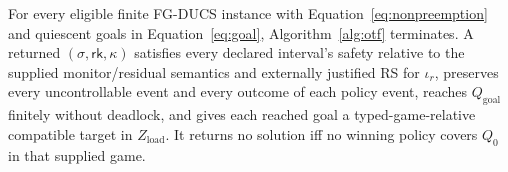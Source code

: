 \documentclass[acmsmall,screen,review,anonymous]{acmart}
\newcommand{\Goal}{Q_{\mathrm{goal}}}
\newcommand{\rank}{\mathsf{rk}}
\begin{document}
\begin{theorem}
\label{thm:correctness}
\label{thm:termination}
\label{thm:soundness}
\label{thm:completeness}
For every eligible finite FG-DUCS instance with Equation~\eqref{eq:nonpreemption} and quiescent goals in Equation~\eqref{eq:goal}, Algorithm~\ref{alg:otf} terminates. A returned $(\sigma,\rank,\kappa)$ satisfies every declared interval's safety relative to the supplied monitor/residual semantics and externally justified RS for $\iota_r$, preserves every uncontrollable event and every outcome of each policy event, reaches $\Goal$ finitely without deadlock, and gives each reached goal a typed-game-relative compatible target in $Z_{\mathrm{load}}$. It returns no solution iff no winning policy covers $Q_0$ in that supplied game.
\end{theorem}
\end{document}
